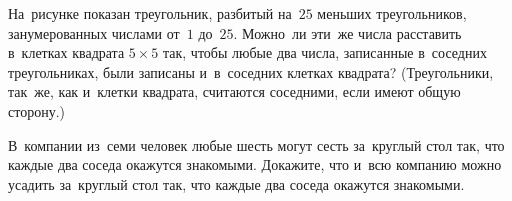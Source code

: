 \begin{problems}
\item
\begin{minipage}[t][][t]{0.65\linewidth}
На~рисунке показан треугольник, разбитый на~$25$ меньших треугольников,
занумерованных числами от~$1$ до~$25$.
Можно~ли эти~же числа расставить в~клетках квадрата $5 \times 5$ так, чтобы
любые два числа, записанные в~соседних треугольниках, были записаны
и~в~соседних клетках квадрата?
(Треугольники, так~же, как и~клетки квадрата, считаются соседними, если имеют
общую сторону.)
\end{minipage}%
\hfill
\begin{minipage}[t][][b]{0.33\linewidth}
    \vspace{-1ex}
\end{minipage}

\item
В~компании из~семи человек любые шесть могут сесть за~круглый стол так, что
каждые два соседа окажутся знакомыми.
Докажите, что и~всю компанию можно усадить за~круглый стол так, что каждые два
соседа окажутся знакомыми.

\end{problems}

